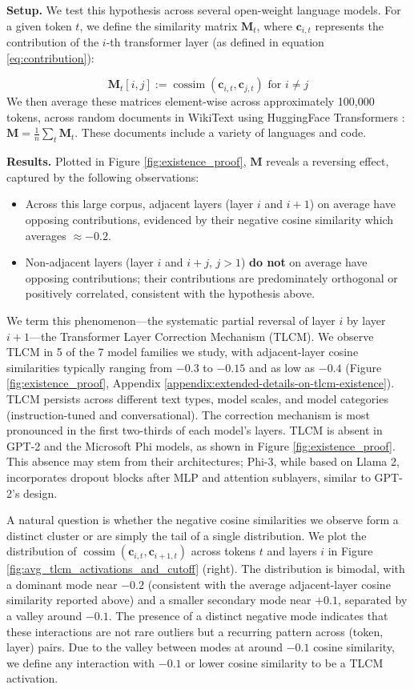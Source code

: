 \textbf{Setup.} We test this hypothesis across several open-weight language models. For a given token $t$, we define the similarity matrix $\mathbf{M}_t$, where $\mathbf{c}_{i,t}$ represents the contribution of the $i$-th transformer layer (as defined in equation \ref{eq:contribution}):

$$\mathbf{M}_t[i,j] := \operatorname{cossim}(\mathbf{c}_{i,t}, \mathbf{c}_{j,t}) \text{ for } i \neq j$$
We then average these matrices element-wise across approximately 100,000 tokens, across random documents in WikiText \cite{merity2016pointer} using HuggingFace Transformers \cite{wolf-etal-2020-transformers}: $\mathbf{M} = \frac{1}{n} \sum_t \mathbf{M}_t$. These documents include a variety of languages and code.

\textbf{Results.} Plotted in Figure \ref{fig:existence_proof}, $\mathbf{M}$ reveals a reversing effect, captured by the following observations:
\begin{itemize}
    \item Across this large corpus, adjacent layers (layer $i$ and $i+1$) on average have opposing contributions, evidenced by their negative cosine similarity which averages $\approx -0.2$.
    \item Non-adjacent layers (layer $i$ and $i+j$, $j>1$) \textbf{do not} on average have opposing contributions; their contributions are predominately orthogonal or positively correlated, consistent with the hypothesis above.
\end{itemize}

We term this phenomenon---the systematic partial reversal of layer $i$ by layer $i+1$---the Transformer Layer Correction Mechanism (TLCM). We observe TLCM in 5 of the 7 model families we study, with adjacent-layer cosine similarities typically ranging from $-0.3$ to $-0.15$ and as low as $-0.4$ (Figure \ref{fig:existence_proof}, Appendix \ref{appendix:extended-details-on-tlcm-existence}). TLCM persists across different text types, model scales, and model categories (instruction-tuned and conversational). The correction mechanism is most pronounced in the first two-thirds of each model's layers. TLCM is absent in GPT-2 and the Microsoft Phi models, as shown in Figure \ref{fig:existence_proof}. This absence may stem from their architectures; Phi-3, while based on Llama 2, incorporates dropout blocks after MLP and attention sublayers, similar to GPT-2's design.

A natural question is whether the negative cosine similarities we observe form a distinct cluster or are simply the tail of a single distribution. We plot the distribution of $\operatorname{cossim}(\mathbf{c}_{i,t}, \mathbf{c}_{i+1,t})$ across tokens $t$ and layers $i$ in Figure \ref{fig:avg_tlcm_activations_and_cutoff} (right). The distribution is bimodal, with a dominant mode near $-0.2$ (consistent with the average adjacent-layer cosine similarity reported above) and a smaller secondary mode near $+0.1$, separated by a valley around $-0.1$. The presence of a distinct negative mode indicates that these interactions are not rare outliers but a recurring pattern across (token, layer) pairs. Due to the valley between modes at around $-0.1$ cosine similarity, we define any interaction with $-0.1$ or lower cosine similarity to be a TLCM activation.

